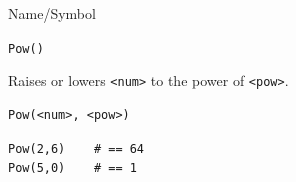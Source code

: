 \begin{desc}{Name/Symbol}
\item[Name/Symbol]	\verb+Pow()+ 

\item[Description]	Raises or lowers \verb+<num>+ to the power of \verb+<pow>+.

\item[Usage]		
\begin{verbatim}
Pow(<num>, <pow>)
\end{verbatim}

\item[Example]	
\begin{verbatim}
Pow(2,6)	# == 64
Pow(5,0)	# == 1
\end{verbatim}

\item[See Also]     
\end{desc}


